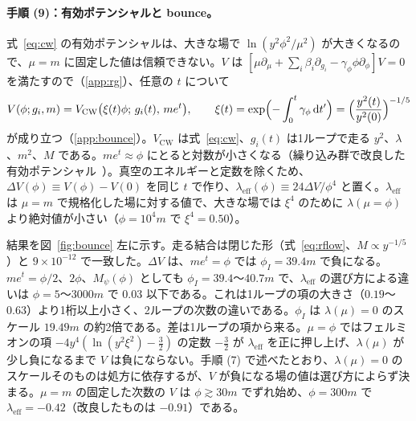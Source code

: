 \documentclass[a4paper,10pt]{ltjsarticle}
\newcommand{\dd}{\mathrm{d}}
\begin{document}
\paragraph{手順 (9)：有効ポテンシャルと bounce。}式~\eqref{eq:cw} の有効ポテンシャルは、大きな場で $\ln(y^2\phi^2/\mu^2)$ が大きくなるので、$\mu=m$ に固定した値は信頼できない。$V$ は $[\mu\partial_\mu+\sum_i\beta_i\partial_{g_i}-\gamma_\phi\phi\partial_\phi]V=0$ を満たすので（\ref{app:rg}）、任意の $t$ について
\begin{equation}
V(\phi;g_i,m)=V_{\mathrm{CW}}\bigl(\xi(t)\phi;\,g_i(t),\,me^t\bigr),\qquad
\xi(t)=\exp\Bigl(-\int_0^t\gamma_\phi\,\dd t'\Bigr)=\Bigl(\frac{y^2(t)}{y^2(0)}\Bigr)^{-1/5}
\label{eq:vrg}
\end{equation}
が成り立つ（\ref{app:bounce}）。$V_{\mathrm{CW}}$ は式~\eqref{eq:cw}、$g_i(t)$ は1ループで走る $y^2$、$\lambda$、$m^2$、$M$ である。$me^t\approx\phi$ にとると対数が小さくなる（繰り込み群で改良した有効ポテンシャル~\cite{sher}）。真空のエネルギーと定数を除くため、$\Delta V(\phi)\equiv V(\phi)-V(0)$ を同じ $t$ で作り、$\lambda_{\mathrm{eff}}(\phi)\equiv24\Delta V/\phi^4$ と置く。$\lambda_{\mathrm{eff}}$ は $\mu=m$ で規格化した場に対する値で、大きな場では $\xi^4$ のために $\lambda(\mu=\phi)$ より絶対値が小さい（$\phi=10^4m$ で $\xi^4=0.50$）。

結果を図~\ref{fig:bounce} 左に示す。走る結合は閉じた形（式~\eqref{eq:rflow}、$M\propto y^{-1/5}$）と $9\times10^{-12}$ で一致した。$\Delta V$ は、$me^t=\phi$ では $\phi_I=39.4m$ で負になる。$me^t=\phi/2$、$2\phi$、$M_\psi(\phi)$ としても $\phi_I=39.4$〜$40.7m$ で、$\lambda_{\mathrm{eff}}$ の選び方による違いは $\phi=5$〜$3000m$ で $0.03$ 以下である。これは1ループの項の大きさ（$0.19$〜$0.63$）より1桁以上小さく、2ループの次数の違いである。$\phi_I$ は $\lambda(\mu)=0$ のスケール $19.49m$ の約2倍である。差は1ループの項から来る。$\mu=\phi$ ではフェルミオンの項 $-4y^4(\ln(y^2\xi^2)-\frac32)$ の定数 $-\frac32$ が $\lambda_{\mathrm{eff}}$ を正に押し上げ、$\lambda(\mu)$ が少し負になるまで $V$ は負にならない。手順 (7) で述べたとおり、$\lambda(\mu)=0$ のスケールそのものは処方に依存するが、$V$ が負になる場の値は選び方によらず決まる。$\mu=m$ の固定した次数の $V$ は $\phi\gtrsim30m$ でずれ始め、$\phi=300m$ で $\lambda_{\mathrm{eff}}=-0.42$（改良したものは $-0.91$）である。
\end{document}
